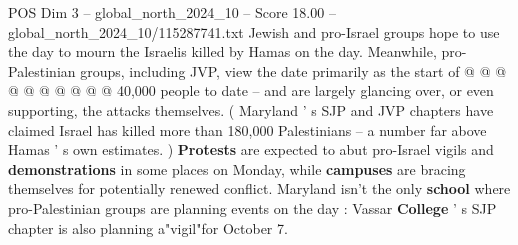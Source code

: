 \begin{textsample}{POS Dim 3 – global\_north\_2024\_10 – Score 18.00 – global\_north\_2024\_10/115287741.txt}
Jewish and pro-Israel groups hope to use the day to mourn the Israelis killed by Hamas on the day.
Meanwhile, pro-Palestinian groups, including JVP, view the date primarily as the start of @ @ @ @ @ @ @ @ @ @ 40,000 people to date -- and are largely glancing over, or even supporting, the attacks themselves. ( Maryland ' s SJP and JVP chapters have claimed Israel has killed more than 180,000 Palestinians -- a number far above Hamas ' s own estimates. ) \textbf{Protests} are expected to abut pro-Israel vigils and \textbf{demonstrations} in some places on Monday, while \textbf{campuses} are bracing themselves for potentially renewed conflict.
Maryland isn't the only \textbf{school} where pro-Palestinian groups are planning events on the day : Vassar \textbf{College} ' s SJP chapter is also planning a"vigil"for October 7.

\end{textsample}
